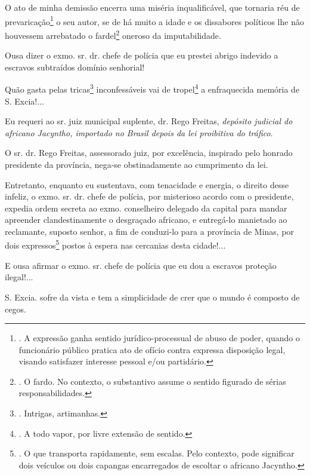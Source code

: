 O ato de minha demissão encerra uma miséria inqualificável, que tornaria
réu de prevaricação\footnote{. A expressão ganha sentido
  jurídico-processual de abuso de poder, quando o funcionário público
  pratica ato de ofício contra expressa disposição legal, visando
  satisfazer interesse pessoal e/ou partidário.} o seu autor, se de há
muito a idade e os dissabores políticos lhe não houvessem arrebatado o
fardel\footnote{. O fardo. No contexto, o substantivo assume o sentido
  figurado de sérias responsabilidades.} oneroso da imputabilidade.

Ousa dizer o exmo. sr. dr. chefe de polícia que eu prestei abrigo
indevido a escravos subtraídos domínio senhorial!

Quão gasta pelas tricas\footnote{. Intrigas, artimanhas.} inconfessáveis
vai de tropel\footnote{. A todo vapor, por livre extensão de sentido.} a
enfraquecida memória de S. Excia!...

Eu requeri ao sr. juiz municipal suplente, dr. Rego Freitas,
\emph{depósito judicial do africano Jacyntho, importado no Brasil depois
da lei proibitiva do tráfico}.

O sr. dr. Rego Freitas, assessorado juiz, por excelência, inspirado pelo
honrado presidente da província, nega-se obstinadamente ao cumprimento
da lei.

Entretanto, enquanto eu sustentava, com tenacidade e energia, o direito
desse infeliz, o exmo. sr. dr. chefe de polícia, por misterioso acordo
com o presidente, expedia ordem secreta ao exmo. conselheiro delegado da
capital para mandar apreender clandestinamente o desgraçado africano, e
entregá-lo manietado ao reclamante, suposto senhor, a fim de conduzi-lo
para a província de Minas, por dois expressos\footnote{. O que
  transporta rapidamente, sem escalas. Pelo contexto, pode significar
  dois veículos ou dois capangas encarregados de escoltar o africano
  Jacyntho.} postos à espera nas cercanias desta cidade!...

E ousa afirmar o exmo. sr. chefe de polícia que eu dou a escravos
proteção ilegal!...

S. Excia. sofre da vista e tem a simplicidade de crer que o mundo é
composto de cegos.

